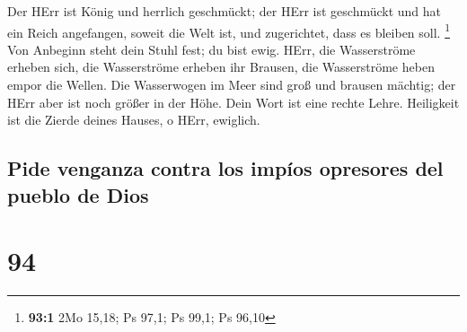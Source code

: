  Der HErr ist König und herrlich geschmückt; der HErr ist
geschmückt und hat ein Reich angefangen, soweit die Welt ist, und
zugerichtet, dass es bleiben soll. \footnote{\textbf{93:1} 2Mo 15,18; Ps
  97,1; Ps 99,1; Ps 96,10}  Von Anbeginn steht dein Stuhl
fest; du bist ewig.  HErr, die Wasserströme erheben sich,
die Wasserströme erheben ihr Brausen, die Wasserströme heben empor die
Wellen.  Die Wasserwogen im Meer sind groß und brausen
mächtig; der HErr aber ist noch größer in der Höhe.  Dein
Wort ist eine rechte Lehre. Heiligkeit ist die Zierde deines Hauses, o
HErr, ewiglich.

\hypertarget{pide-venganza-contra-los-impuxedos-opresores-del-pueblo-de-dios}{%
\subsection{Pide venganza contra los impíos opresores del pueblo de
Dios}\label{pide-venganza-contra-los-impuxedos-opresores-del-pueblo-de-dios}}

\hypertarget{section-93}{%
\section{94}\label{section-93}}

